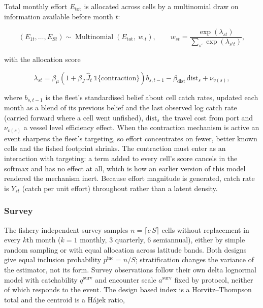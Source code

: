 \documentclass[
  11pt,
  a4paper,
]{article}
\begin{document}
Total monthly effort \(E_{\text{tot}}\) is allocated across cells by a
multinomial draw on information available before month \(t\):

\begin{equation}
\left(E_{1t}, \dots, E_{St}\right) \sim \operatorname{Multinomial}\!\left(E_{\text{tot}},\ w_{\cdot t}\right), \qquad w_{st} = \frac{\exp(\lambda_{st})}{\sum_{s'} \exp(\lambda_{s't})},
\end{equation}

\noindent with the allocation score

\begin{equation}
\lambda_{st} = \beta_\mu\left(1 + \beta_J\,\hat{J}_t\,\mathbb{1}\{\text{contraction}\}\right) b_{s,t-1} - \beta_{\text{dist}}\,\text{dist}_s + \nu_{v(s)},
\end{equation}

\noindent where \(b_{s,t-1}\) is the fleet's standardised belief about cell catch
rates, updated each month as a blend of its previous belief and the last
observed log catch rate (carried forward where a cell went unfished),
\(\text{dist}_s\) the travel cost from port and \(\nu_{v(s)}\) a vessel
level efficiency effect. When the contraction mechanism is active an
event sharpens the fleet's targeting, so effort concentrates on fewer,
better known cells and the fished footprint shrinks. The contraction
must enter as an interaction with targeting: a term added to every
cell's score cancels in the softmax and has no effect at all, which is
how an earlier version of this model rendered the mechanism inert.
Because effort magnitude is generated, catch rate is \(Y_{st}\) (catch
per unit effort) throughout rather than a latent density.

\hypertarget{survey}{%
\subsubsection{Survey}\label{survey}}

The fishery independent survey samples \(n = \lceil c\,S \rceil\) cells
without replacement in every \(k\)th month (\(k = 1\) monthly, 3
quarterly, 6 semiannual), either by simple random sampling or with equal
allocation across latitude bands. Both designs give equal inclusion
probability \(p^{\text{inc}} = n / S\); stratification changes the
variance of the estimator, not its form. Survey observations follow
their own delta lognormal model with catchability \(q^{\text{surv}}\)
and encounter scale \(a^{\text{surv}}\) fixed by protocol, neither of
which responds to the event. The design based index is a
Horvitz--Thompson total and the centroid is a Hájek ratio,
\end{document}
